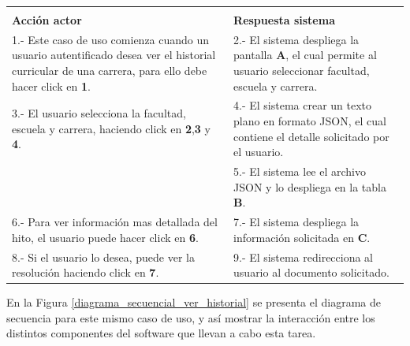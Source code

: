 \begin{longtable}{p{7cm}| p{7cm}}
			\rowcolor{LightBlue2}  \multicolumn{2}{c}{Curso normal de eventos} \\ 
			
			\textbf{Acción actor} &	\textbf{Respuesta sistema} \\ \hline
			
			1.- Este caso de uso comienza cuando un usuario autentificado desea ver el historial curricular de una carrera, para ello debe hacer click en \textbf{1}.
			 &	2.- El sistema despliega la pantalla \textbf{A}, el cual permite al usuario seleccionar facultad, escuela y carrera. \\ \hline
		
		
			3.- El usuario selecciona la facultad, escuela y carrera, haciendo click en \textbf{2},\textbf{3} y \textbf{4}.
			&	4.- El sistema crear un texto plano en formato JSON, el cual contiene el detalle solicitado por el usuario.\\ \hline
			
			
			& 5.- El sistema lee el archivo JSON y lo despliega en la tabla \textbf{B}.\\ \hline
			
			6.- Para ver información mas detallada del hito, el usuario puede hacer click en \textbf{6}.
			&	7.- El sistema despliega la información solicitada en \textbf{C}.\\ \hline
		
		
			8.- Si el usuario lo desea, puede ver la resolución haciendo click en \textbf{7}.
			&	9.- El sistema redirecciona al usuario al documento solicitado.\\ \hline
		\end{longtable}
		
		
		En la Figura \ref{diagrama_secuencial_ver_historial} se presenta el diagrama de secuencia para este mismo caso de uso, y así mostrar la interacción entre los distintos componentes del software que llevan a cabo esta tarea.
		
